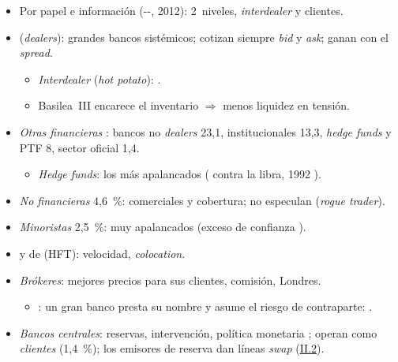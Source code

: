 \documentclass{article}
\begin{document}
\begin{columnas}
\begin{itemize}
\item Por papel e información (--, 2012): 2~niveles, \emph{interdealer} y clientes.
\end{itemize}
\begin{itemize}
\item {} (\emph{dealers}): grandes bancos sistémicos; cotizan siempre \emph{bid} y \emph{ask}; ganan con el \emph{spread}.
  \begin{itemize}
  \item \emph{Interdealer} (\emph{hot potato}): .
  \item Basilea~III encarece el inventario $\Rightarrow$ menos liquidez en tensión.
  \end{itemize}
\end{itemize}
\begin{itemize}
\item \emph{Otras financieras} : bancos no \emph{dealers} 23,1, institucionales 13,3, \emph{hedge funds} y PTF 8, sector oficial 1,4.
  \begin{itemize}
  \item \emph{Hedge funds}: los más apalancados ( contra la libra, 1992 ).
  \end{itemize}
\item \emph{No financieras} 4,6~\%: comerciales y cobertura; no especulan (\emph{rogue trader}).
\item \emph{Minoristas} 2,5~\%: muy apalancados (exceso de confianza ).
\item {} y de  (HFT): velocidad, \emph{colocation}.
\end{itemize}
\begin{itemize}
\item \emph{Brókeres}: mejores precios para sus clientes, comisión, Londres.
  \begin{itemize}
  \item {}: un gran banco presta su nombre y asume el riesgo de contraparte: .
  \end{itemize}
\item \emph{Bancos centrales}: reservas, intervención, política monetaria ; operan como \emph{clientes} (1,4~\%); los emisores de reserva dan líneas \emph{swap} (\hyperref[rep:II.2]{II.2}).
\end{itemize}


\end{columnas}
\end{document}
